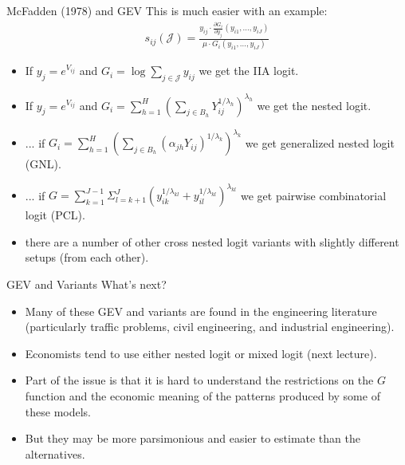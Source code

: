 \documentclass[xcolor=pdftex,dvipsnames,table,mathserif,aspectratio=169]{beamer}
\begin{document}
\begin{frame}{McFadden (1978) and GEV}
This is much easier with an example:
\begin{align*}
s_{ij}(\mathcal{J})=\frac{y_{ij}\cdot  \frac{\partial G_i}{\partial y_{j}}\left(y_{i1}, \ldots, y_{iJ}\right)}{\mu \cdot G_i\left(y_{i1}, \ldots, y_{iJ}\right)}
\end{align*}
\begin{itemize}
\item If $y_j = e^{V_{ij}}$ and $G_i = \log \sum_{j \in \mathcal{J}} y_{ij} $ we get the IIA logit.
\item If $y_j = e^{V_{ij}}$ and $G_i=\sum_{h=1}^{H}\left(\sum_{j \in B_{h}} Y_{ij}^{1 / \lambda_{h}}\right)^{\lambda_{h}}$ we get the nested logit.
\item ... if $G_i=\sum_{h=1}^{H}\left(\sum_{j \in B_{h}}\left(\alpha_{j h} Y_{ij}\right)^{1 / \lambda_{k}}\right)^{\lambda_{k}}$ we get \alert{generalized nested logit} (GNL).
\item ... if $G=\sum_{k=1}^{J-1} \Sigma_{l=k+1}^{J}\left(y_{i k}^{1 / \lambda_{k l}}+y_{i l}^{1 / \lambda_{k l}}\right)^{\lambda_{k l}}$ we get \alert{pairwise combinatorial logit} (PCL).
\item there are a number of other \alert{cross nested logit} variants with slightly different setups (from each other).
\end{itemize}
\end{frame}



\begin{frame}{GEV and Variants}
What's next?
\begin{itemize}
\item Many of these GEV and variants are found in the engineering literature (particularly traffic problems, civil engineering, and industrial engineering).
\item Economists tend to use either nested logit or mixed logit (next lecture).
\item Part of the issue is that it is hard to understand the restrictions on the $G$ function and the economic meaning of the patterns produced by some of these models.
\item But they may be more parsimonious and easier to estimate than the alternatives.
\end{itemize}
\end{frame}
\end{document}

